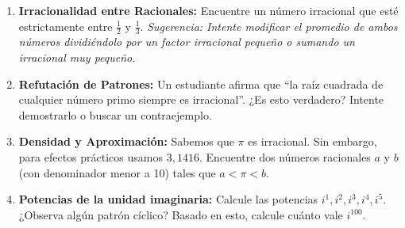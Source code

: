\begin{enumerate}
    \item \textbf{Irracionalidad entre Racionales:}
    Encuentre un número irracional que esté estrictamente entre $\frac{1}{2}$ y $\frac{1}{3}$. 
    \textit{Sugerencia: Intente modificar el promedio de ambos números dividiéndolo por un factor irracional pequeño o sumando un irracional muy pequeño.}

    \item \textbf{Refutación de Patrones:}
    Un estudiante afirma que ``la raíz cuadrada de cualquier número primo siempre es irracional''. ¿Es esto verdadero? Intente demostrarlo o buscar un contraejemplo.

    \item \textbf{Densidad y Aproximación:}
    Sabemos que $\pi$ es irracional. Sin embargo, para efectos prácticos usamos $3,1416$. Encuentre dos números racionales $a$ y $b$ (con denominador menor a 10) tales que $a < \pi < b$.

    \item \textbf{Potencias de la unidad imaginaria:}
    Calcule las potencias $i^1, i^2, i^3, i^4, i^5$. ¿Observa algún patrón cíclico? Basado en esto, calcule cuánto vale $i^{100}$.
\end{enumerate}
